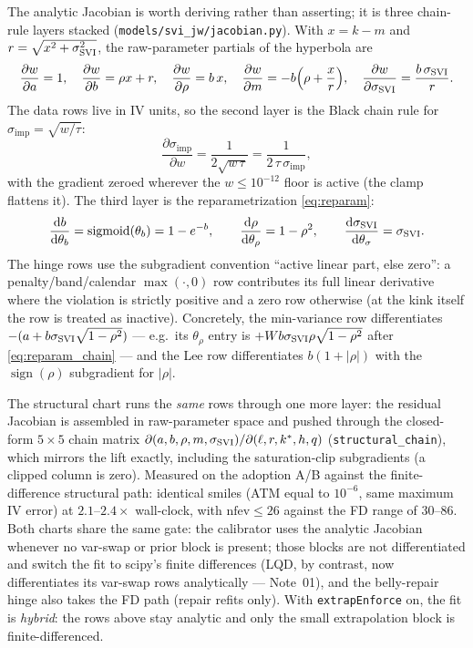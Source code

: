 \documentclass[11pt]{article}
\begin{document}
The analytic Jacobian is worth deriving rather than asserting; it is three
chain-rule layers stacked (\texttt{models/svi\_jw/jacobian.py}). With
$x=k-m$ and $r=\sqrt{x^2+\sigma_{\mathrm{SVI}}^2}$, the raw-parameter partials of the
hyperbola are
\begin{equation}
\frac{\partial w}{\partial a}=1,\quad
\frac{\partial w}{\partial b}=\rho x+r,\quad
\frac{\partial w}{\partial\rho}=b\,x,\quad
\frac{\partial w}{\partial m}=-b\Big(\rho+\frac{x}{r}\Big),\quad
\frac{\partial w}{\partial\sigma_{\mathrm{SVI}}}=\frac{b\,\sigma_{\mathrm{SVI}}}{r}.
\label{eq:svi_partials}
\end{equation}
The data rows live in IV units, so the second layer is the Black chain rule
for $\sigma_{\text{imp}}=\sqrt{w/\tau}$:
\begin{equation}
\frac{\partial\sigma_{\text{imp}}}{\partial w}
=\frac{1}{2\sqrt{w\,\tau}}
=\frac{1}{2\,\tau\,\sigma_{\text{imp}}},
\label{eq:iv_chain}
\end{equation}
with the gradient zeroed wherever the $w\le10^{-12}$ floor is active (the
clamp flattens it). The third layer is the reparametrization
\eqref{eq:reparam}:
\begin{equation}
\frac{\mathrm{d} b}{\mathrm{d}\theta_b}=\operatorname{sigmoid}(\theta_b)=1-e^{-b},\qquad
\frac{\mathrm{d}\rho}{\mathrm{d}\theta_\rho}=1-\rho^2,\qquad
\frac{\mathrm{d}\sigma_{\mathrm{SVI}}}{\mathrm{d}\theta_\sigma}=\sigma_{\mathrm{SVI}}.
\label{eq:reparam_chain}
\end{equation}
The hinge rows use the subgradient convention ``active linear part, else
zero'': a penalty/band/calendar $\max(\cdot,0)$ row contributes its full
linear derivative where the violation is strictly positive and a zero row
otherwise (at the kink itself the row is treated as inactive). Concretely,
the min-variance row differentiates
$-(a+b\sigma_{\mathrm{SVI}}\sqrt{1-\rho^2})$ --- e.g.\ its $\theta_\rho$ entry is
$+Wb\sigma_{\mathrm{SVI}}\rho\sqrt{1-\rho^2}$ after \eqref{eq:reparam_chain} --- and the
Lee row differentiates $b(1+|\rho|)$ with the $\operatorname{sign}(\rho)$
subgradient for $|\rho|$.

The structural chart runs the \emph{same} rows through one more layer: the
residual Jacobian is assembled in raw-parameter space and pushed through the
closed-form $5\times5$ chain matrix
$\partial(a,b,\rho,m,\sigma_{\mathrm{SVI}})/\partial(\ell,r,k^*,h,q)$
(\texttt{structural\_chain}), which mirrors the lift exactly, including the
saturation-clip subgradients (a clipped column is zero). Measured on the
adoption A/B against the finite-difference structural path: identical smiles
(ATM equal to $10^{-6}$, same maximum IV error) at $2.1$--$2.4\times$
wall-clock, with $\text{nfev}\le26$ against the FD range of $30$--$86$. Both
charts share the same gate: the calibrator uses the analytic Jacobian
whenever no var-swap or prior block is present; those blocks are not
differentiated and switch the fit to scipy's finite differences (LQD, by
contrast, now differentiates its var-swap rows analytically --- Note~01),
and the belly-repair hinge also takes the FD path (repair refits only). With
\texttt{extrapEnforce} on, the fit is \emph{hybrid}: the rows above stay
analytic and only the small extrapolation block is finite-differenced.
\end{document}
